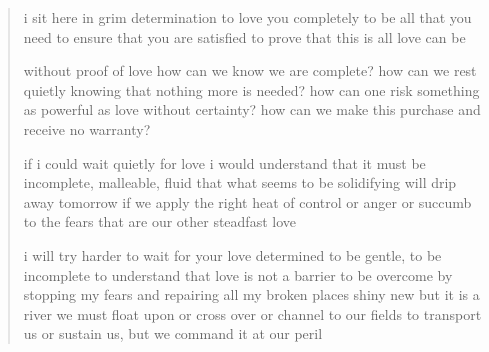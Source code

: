 \begin{verse}
i sit here in grim determination 
to love you completely
to be all that you need
to ensure that you are satisfied
to prove that this is all love can be

without proof of love 
how can we know we are complete?
how can we rest quietly knowing 
that nothing more is needed?
how can one risk something as 
powerful as love without certainty?
how can we make this purchase
and receive no warranty?

if i could wait quietly for love
i would understand that it must be
incomplete, malleable, fluid
that what seems to be solidifying
will drip away tomorrow if we 
apply the right heat
of control or anger or succumb to
the fears that are our other steadfast love

i will try harder to wait for your love
determined to be gentle, to be incomplete
to understand that love is not a barrier
to be overcome by stopping my fears
and repairing all my broken places shiny new
but it is a river we must float upon
or cross over or channel to our fields
to transport us or sustain us,
but we command it at our peril
\end{verse}

